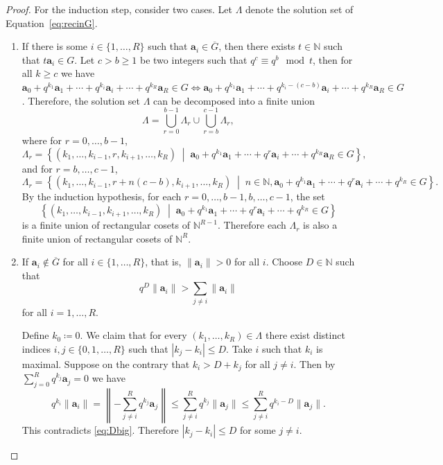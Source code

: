 \documentclass[letterpaper, 11pt, thm-restate]{article}
\numberwithin{equation}{section}
\newcommand{\N}{\mathbb{N}}
\newcommand{\ba}{\boldsymbol{a}}
\newcommand{\oG}{\overline{G}}
\theoremstyle{definition}
\theoremstyle{definition}
\theoremstyle{definition}
\begin{document}
\begin{proof}
    For the induction step, consider two cases.
    Let $\Lambda$ denote the solution set of Equation~\eqref{eq:recinG}.
    \begin{enumerate}[wide, label = \textbf{Case~\arabic*:}]
        \item 
    If there is some $i \in \{1, \ldots, R\}$ such that $\ba_i \in \oG$, then there exists $t \in \N$ such that $t \ba_i \in G$. Let $c > b \geq 1$ be two integers such that $q^c \equiv q^b \mod t$, then for all $k \geq c$ we have $\ba_0 + q^{k_1} \ba_1 + \cdots + q^{k_i} \ba_i + \cdots + q^{k_R} \ba_R \in G \iff \ba_0 + q^{k_1} \ba_1 + \cdots + q^{k_i - (c - b)} \ba_i + \cdots + q^{k_R} \ba_R \in G$.
    Therefore, the solution set $\Lambda$ can be decomposed into a finite union
    \[
    \Lambda = \bigcup_{r = 0}^{b-1} \Lambda_r \cup \bigcup_{r = b}^{c-1} \Lambda_r,
    \]
    where for $r = 0, \ldots, b-1$,
    \[
    \Lambda_r = \left\{(k_1, \ldots, k_{i-1}, r, k_{i+1}, \ldots, k_R) \;\middle|\; \ba_0 + q^{k_1} \ba_1 + \cdots + q^{r} \ba_i + \cdots + q^{k_R} \ba_R \in G \right\},
    \]
    and for $r = b, \ldots, c-1$,
    \[
    \Lambda_r = \left\{(k_1, \ldots, k_{i-1}, r + n (c-b), k_{i+1}, \ldots, k_R) \;\middle|\; n \in \N, \ba_0 + q^{k_1} \ba_1 + \cdots + q^{r} \ba_i + \cdots + q^{k_R} \in G \right\}.
    \]
    By the induction hypothesis, for each $r = 0, \ldots, b-1, b, \ldots, c-1$, the set
    \[
    \left\{(k_1, \ldots, k_{i-1}, k_{i+1}, \ldots, k_R) \;\middle|\; \ba_0 + q^{k_1} \ba_1 + \cdots + q^{r} \ba_i + \cdots + q^{k_R} \in G\right\}
    \]
    is a finite union of rectangular cosets of $\N^{R-1}$. 
    Therefore each $\Lambda_r$ is also a finite union of rectangular cosets of $\N^{R}$.

    \item 
    If $\ba_i \notin \oG$ for all $i \in \{1, \ldots, R\}$, that is, $\|\ba_i\| > 0$ for all $i$.
    Choose $D \in \N$ such that
    \begin{equation}\label{eq:Dbig}
    q^D \|\ba_i\| > \sum_{j \neq i} \|\ba_i\|
    \end{equation}
    for all $i = 1, \ldots, R$.
    
    Define $k_0 \coloneqq 0$.
    We claim that for every $(k_1, \ldots, k_R) \in \Lambda$ there exist distinct indices $i, j \in \{0, 1, \ldots, R\}$ such that $|k_j - k_i| \leq D$.
    Take $i$ such that $k_i$ is maximal. Suppose on the contrary that $k_i > D + k_j$ for all $j \neq i$. Then by $\sum_{j = 0}^R q^{k_j} \ba_j = 0$ we have
    \[
    q^{k_i}\|\ba_i\| =  \left\| - \sum_{j \neq i}^R q^{k_j} \ba_j \right\| \leq \sum_{j \neq i}^R q^{k_j} \|\ba_j\| \leq \sum_{j \neq i}^R q^{k_i - D} \|\ba_j\|.
    \]
    This contradicts \eqref{eq:Dbig}.
    Therefore $|k_j - k_i| \leq D$ for some $j \neq i$.


\end{enumerate}
\end{proof}
\end{document}
